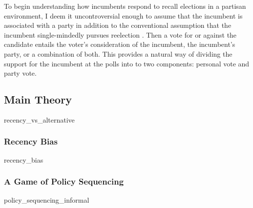 \documentclass[hyphens, crop=false]{standalone}
\begin{document}
		To begin understanding how incumbents respond to recall elections
		in a partisan environment,
		I deem it uncontroversial enough to assume that
		the incumbent
		is associated with a party
		in addition to the conventional assumption that the incumbent
		single-mindedly pursues reelection
		\autocite{mayhewCongressElectoralConnection1974}.
		Then a vote for or against the candidate
		entails the voter's consideration of
		the incumbent,
		the incumbent's party,
		or a combination of both.
		This provides a natural way of dividing the support for the incumbent at the polls
		into to two components:
		personal vote and party vote.
			
			
%			
%		
%		
			

		
		
		
		
	\subsection*{Main Theory}
		{recency_vs_alternative}
		
		
		
		\subsubsection*{Recency Bias}
			{recency_bias}
		
	
		\subsubsection*{A Game of Policy Sequencing}
			{policy_sequencing_informal}
			
		
\end{document}
